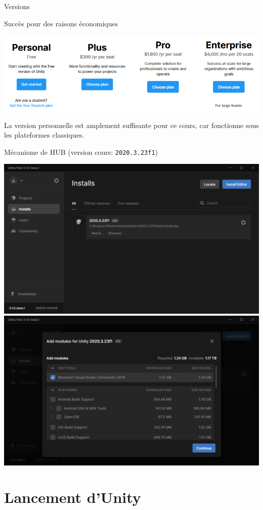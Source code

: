 \begin{frame}{Versions}
	\begin{block}{Succès pour des raisons économiques}
\begin{center}
	\includegraphics[width=0.5\linewidth]{../../imgs/licence_plan}
\end{center}

	La version personnelle est amplement suffisante pour ce cours, car fonctionne sous les plateformes classiques.
	\end{block}

	\begin{block}{Mécanisme de HUB (version cours: \texttt{2020.3.23f1})}
\begin{center}
\hfill
	\includegraphics[width=0.45\linewidth]{../../imgs/unity_hub}
\hfill
	\includegraphics[width=0.45\linewidth]{../../imgs/unity_hub_module}
\hfill
\end{center}

	\end{block}
\end{frame}

\section{Lancement d'Unity}

